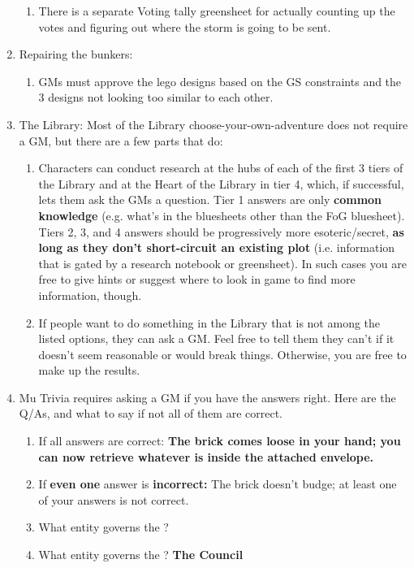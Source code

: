 \documentclass[green]{GL2020}
\begin{document}
\begin{enumerate}
\begin{enumerate}
		\item There is a separate Voting tally greensheet for actually counting up the votes and figuring out where the storm is going to be sent.
	\end{enumerate}
	\item Repairing the bunkers:
	\begin{enumerate}
		\item GMs must approve the lego designs based on the GS constraints and the 3 designs not looking too similar to each other.
	\end{enumerate}
	\item The Library: Most of the Library choose-your-own-adventure does not require a GM, but there are a few parts that do:
	\begin{enumerate}
		\item Characters can conduct research at the hubs of each of the first 3 tiers of the Library and at the Heart of the Library in tier 4, which, if successful, lets them ask the GMs a question. Tier 1 answers are only \textbf{common knowledge} (e.g. what’s in the bluesheets other than the FoG bluesheet). Tiers 2, 3, and 4 answers should be progressively more esoteric/secret, \textbf{as long as they don’t short-circuit an existing plot} (i.e. information that is gated by a research notebook or greensheet). In such cases you are free to give hints or suggest where to look in game to find more information, though.
		\item If people want to do something in the Library that is not among the listed options, they can ask a GM. Feel free to tell them they can’t if it doesn’t seem reasonable or would break things. Otherwise, you are free to make up the results.
	\end{enumerate}
	\item Mu Trivia requires asking a GM if you have the answers right. Here are the Q/As, and what to say if not all of them are correct.
	\begin{enumerate}
		\item If all answers are correct: \textbf{The brick comes loose in your hand; you can now retrieve whatever is inside the attached envelope.}
		\item If \textbf{even one} answer is \textbf{incorrect:} The brick doesn't budge; at least one of your answers is not correct.
		\item What entity governs the \pFarm{}?\textbf{ }
		\item What entity governs the \pTech{}? \textbf{The Council}

\end{enumerate}
\end{enumerate}
\end{document}
